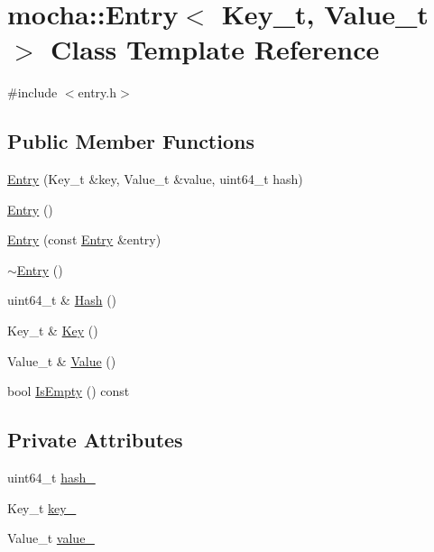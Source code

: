 \hypertarget{classmocha_1_1_entry}{
\section{mocha::Entry$<$ Key\_\-t, Value\_\-t $>$ Class Template Reference}
\label{classmocha_1_1_entry}
}


{\ttfamily \#include $<$entry.h$>$}

\subsection*{Public Member Functions}
\begin{DoxyCompactItemize}
\item 
\hyperlink{classmocha_1_1_entry_aa2d0d8cd3301986d2479d0412a2a651a}{Entry} (Key\_\-t \&key, Value\_\-t \&value, uint64\_\-t hash)
\item 
\hyperlink{classmocha_1_1_entry_af76058aab89f1bc0c51b6fa9a21a064a}{Entry} ()
\item 
\hyperlink{classmocha_1_1_entry_a5c96b995db67bf6a745b4950429870a1}{Entry} (const \hyperlink{classmocha_1_1_entry}{Entry} \&entry)
\item 
\hyperlink{classmocha_1_1_entry_ab43a07f9b9ce23c03040525c02f035d5}{$\sim$Entry} ()
\item 
uint64\_\-t \& \hyperlink{classmocha_1_1_entry_a55e46e9f08f8303cf1dd90090593d139}{Hash} ()
\item 
Key\_\-t \& \hyperlink{classmocha_1_1_entry_a7898fcb80824c8ca0942f8ce2aa53b01}{Key} ()
\item 
Value\_\-t \& \hyperlink{classmocha_1_1_entry_a4dda353e95f495b1fd476b4088d0d008}{Value} ()
\item 
bool \hyperlink{classmocha_1_1_entry_a209f8a4d82ff69efdf04d2047a08105d}{IsEmpty} () const 
\end{DoxyCompactItemize}
\subsection*{Private Attributes}
\begin{DoxyCompactItemize}
\item 
uint64\_\-t \hyperlink{classmocha_1_1_entry_a5bb6e09fcbb7d2a02ed2a3ab99a9e47b}{hash\_\-}
\item 
Key\_\-t \hyperlink{classmocha_1_1_entry_aa9631dc6ed634001c81ed4a115d997d4}{key\_\-}
\item 
Value\_\-t \hyperlink{classmocha_1_1_entry_a51ccc8110ab957f74bfa0812cbd974b6}{value\_\-}
\end{DoxyCompactItemize}

